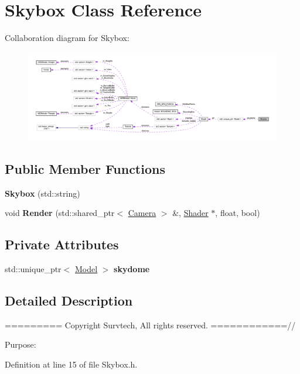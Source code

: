 \hypertarget{class_skybox}{}\section{Skybox Class Reference}
\label{class_skybox}


Collaboration diagram for Skybox\+:
\nopagebreak
\begin{figure}[H]
\begin{center}
\leavevmode
\includegraphics[width=350pt]{class_skybox__coll__graph}
\end{center}
\end{figure}
\subsection*{Public Member Functions}
\begin{DoxyCompactItemize}
\item 
{\bfseries Skybox} (std\+::string)\hypertarget{class_skybox_ae89023375201d5c07883412184866696}{}\label{class_skybox_ae89023375201d5c07883412184866696}

\item 
void {\bfseries Render} (std\+::shared\+\_\+ptr$<$ \hyperlink{class_camera}{Camera} $>$ \&, \hyperlink{class_shader}{Shader} $\ast$, float, bool)\hypertarget{class_skybox_a36a286de972d81b3c6a4862645cc86b8}{}\label{class_skybox_a36a286de972d81b3c6a4862645cc86b8}

\end{DoxyCompactItemize}
\subsection*{Private Attributes}
\begin{DoxyCompactItemize}
\item 
std\+::unique\+\_\+ptr$<$ \hyperlink{class_model}{Model} $>$ {\bfseries skydome}\hypertarget{class_skybox_a0b0e6f5f59bc653ce42ca6e2b417d995}{}\label{class_skybox_a0b0e6f5f59bc653ce42ca6e2b417d995}

\end{DoxyCompactItemize}


\subsection{Detailed Description}
========= Copyright Survtech, All rights reserved. ============//

Purpose\+: 

 

Definition at line 15 of file Skybox.\+h.

